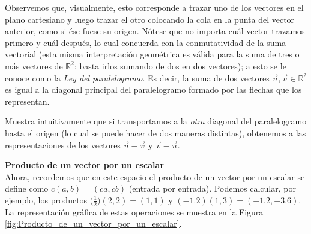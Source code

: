 \documentclass[notasLineal]{subfiles}
\begin{document}
    Observemos que, visualmente, esto corresponde a trazar uno de los vectores en el plano cartesiano y luego trazar el otro colocando la cola en la punta del vector anterior, como si ése fuese su origen. Nótese que no importa cuál vector trazamos primero y cuál después, lo cual concuerda con la conmutatividad de la suma vectorial (esta misma interpretación geométrica es válida para la suma de tres o más vectores de $\mathbb{R}^2$: basta irlos sumando de dos en dos vectores); a esto se le conoce como la \emph{Ley del paralelogramo}. Es decir, la suma de dos vectores $\vec{u},\vec{v}\in\mathbb{R}^2$ es igual a la diagonal principal del paralelogramo formado por las flechas que los representan. %

\begin{Ejer}
    Muestra intuitivamente que si transportamos a la \emph{otra} diagonal del paralelogramo hasta el origen (lo cual se puede hacer de dos maneras distintas), obtenemos a las representaciones de los vectores $\vec{u}-\vec{v}$ y $\vec{v}-\vec{u}$. 
\end{Ejer}

\textbf{Producto de un vector por un escalar} \\

Ahora, recordemos que en este espacio el producto de un vector por un escalar se define como $c(a,b) = (ca,cb)$ (entrada por entrada). Podemos calcular, por ejemplo, los productos $\big(\frac{1}{2}\big)(2,2)=(1,1)$ y $(-1.2)(1,3)=(-1.2,-3.6)$. La representación gráfica de estas operaciones se muestra en la Figura \ref{fig:Producto_de_un_vector_por_un_escalar}.
\end{document}
